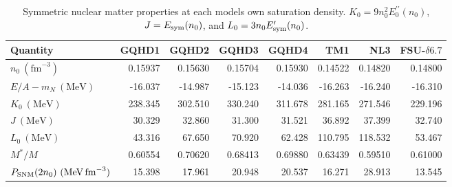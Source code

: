 \begin{table}[t]
\centering
\scriptsize
\caption{Symmetric nuclear matter properties at each model\textquotesingle s own saturation density. $K_0=9n_0^2 E_0^{\prime\prime}(n_0)$, $J=E_{\rm sym}(n_0)$, and $L_0=3n_0 E_{\rm sym}^{\prime}(n_0)$.}
\label{tab:nuclear_properties}
\begin{tabular}{lrrrrrrr}
\hline
Quantity & GQHD1 & GQHD2 & GQHD3 & GQHD4 & TM1 & NL3 & FSU-$\delta6.7$ \\
\hline
$n_0\ (\mathrm{fm}^{-3})$ & 0.15937 & 0.15630 & 0.15704 & 0.15930 & 0.14522 & 0.14820 & 0.14800 \\
$E/A-m_N\ (\mathrm{MeV})$ & -16.037 & -14.987 & -15.123 & -14.036 & -16.263 & -16.240 & -16.310 \\
$K_0\ (\mathrm{MeV})$ & 238.345 & 302.510 & 330.240 & 311.678 & 281.165 & 271.546 & 229.196 \\
$J\ (\mathrm{MeV})$ & 30.329 & 32.860 & 31.300 & 31.521 & 36.892 & 37.399 & 32.740 \\
$L_0\ (\mathrm{MeV})$ & 43.316 & 67.650 & 70.920 & 62.428 & 110.795 & 118.532 & 53.467 \\
$M^*/M$ & 0.60554 & 0.70620 & 0.68413 & 0.69880 & 0.63439 & 0.59510 & 0.61000 \\
$P_{\rm SNM}(2n_0)\ (\mathrm{MeV\,fm}^{-3})$ & 15.398 & 17.961 & 20.948 & 20.537 & 16.271 & 28.913 & 13.545 \\
\hline
\end{tabular}
\end{table}

